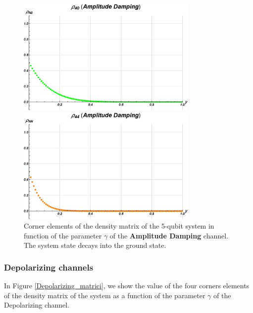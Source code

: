 \begin{figure}[h!]
\begin{minipage}[]{0.5\linewidth}
\end{minipage} \\
\begin{minipage}[c]{0.5\linewidth}
\hspace{1cm}
\centering \includegraphics[width=0.78\textwidth]{./chapter3/Cirq_nuovo/decoerenza/amp_N0.eps}
\end{minipage}
\begin{minipage}[]{0.5\linewidth}
\centering \includegraphics[width=0.78\textwidth]{./chapter3/Cirq_nuovo/decoerenza/amp_NN.eps}
\end{minipage}
\caption{\label{AmplitudeDamping_matrici} Corner elements of the density matrix of the 5-qubit system in function of the parameter $\gamma$ of the \textbf{Amplitude Damping} channel. The system state decays into the ground state.}
\end{figure}

\vspace{-0.4cm}
\subsubsection{Depolarizing channels}
In Figure \ref{Depolarizing_matrici}, we show the value of the four corners elements of the density matrix of the system as a function of the parameter $\gamma$ of the Depolarizing channel. 

